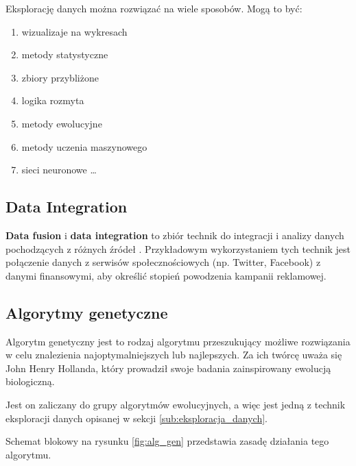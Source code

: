 \documentclass[10pt,twocolumn]{llncs}          %
\begin{document}
Eksplorację danych można rozwiązać na wiele sposobów. Mogą to być:
\begin{enumerate}
    \item wizualizaje na wykresach
    \item metody statystyczne
    \item zbiory przybliżone
    \item logika rozmyta
    \item metody ewolucyjne
    \item metody uczenia maszynowego
    \item sieci neuronowe \ldots
\end{enumerate}

\subsection{Data Integration}
\label{sub:data_integration}
\textbf{Data fusion} i \textbf{data integration} to zbiór technik do integracji i analizy danych pochodzących z różnych źródeł \cite{lenzerini02}. Przykładowym wykorzystaniem tych technik jest połączenie danych z serwisów społecznościowych (np. Twitter, Facebook) z danymi finansowymi, aby określić stopień powodzenia kampanii reklamowej.

\subsection{Algorytmy genetyczne}
\label{sub:algorytmy_genetyczne}
Algorytm genetyczny jest to rodzaj algorytmu przeszukujący możliwe rozwiązania w celu znalezienia najoptymalniejszych lub najlepszych. Za ich twórcę uważa się John Henry Hollanda, który prowadził swoje badania zainspirowany ewolucją biologiczną.

Jest on zaliczany do grupy algorytmów ewolucyjnych, a więc jest jedną z technik eksploracji danych opisanej w sekcji \ref{sub:eksploracja_danych}.

Schemat blokowy na rysunku \ref{fig:alg_gen} przedstawia zasadę działania tego algorytmu.
\end{document}
